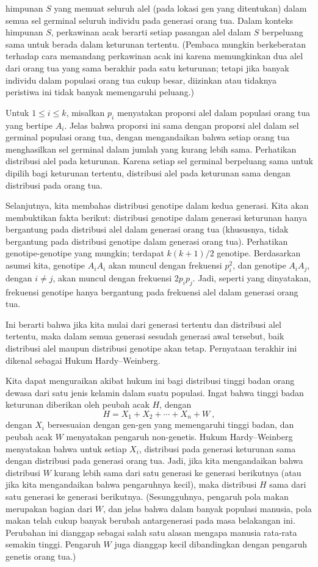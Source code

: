 himpunan $S$ yang memuat seluruh alel (pada lokasi gen yang ditentukan) dalam semua sel germinal
seluruh individu pada generasi orang tua.  Dalam konteks himpunan $S$, perkawinan acak berarti
setiap pasangan alel dalam $S$ berpeluang sama untuk berada dalam keturunan tertentu.  (Pembaca
mungkin berkeberatan terhadap cara memandang perkawinan acak ini karena memungkinkan dua alel dari
orang tua yang sama berakhir pada satu keturunan; tetapi jika banyak individu dalam populasi orang
tua cukup besar, diizinkan atau tidaknya peristiwa ini tidak banyak memengaruhi peluang.)
\par
Untuk $1 \le i \le k$, misalkan $p_i$ menyatakan proporsi alel dalam populasi orang tua yang
bertipe $A_i$.  Jelas bahwa proporsi ini sama dengan proporsi alel dalam sel germinal populasi
orang tua, dengan mengandaikan bahwa setiap orang tua menghasilkan sel germinal dalam jumlah yang
kurang lebih sama.  Perhatikan distribusi alel pada keturunan.  Karena setiap sel germinal berpeluang sama
untuk dipilih bagi keturunan tertentu, distribusi alel pada keturunan sama dengan distribusi pada
orang tua.
\par
Selanjutnya, kita membahas distribusi genotipe dalam kedua generasi.  Kita akan membuktikan fakta
berikut: distribusi genotipe dalam generasi keturunan hanya bergantung pada distribusi alel dalam
generasi orang tua (khususnya, tidak bergantung pada distribusi genotipe dalam generasi orang tua).
Perhatikan genotipe-genotipe yang mungkin; terdapat $k(k+1)/2$ genotipe.  Berdasarkan asumsi kita,
genotipe $A_iA_i$ akan muncul dengan frekuensi $p_i^2$, dan genotipe $A_iA_j$, dengan $i \ne j$,
akan muncul dengan frekuensi $2p_ip_j$.  Jadi, seperti yang dinyatakan, frekuensi genotipe hanya
bergantung pada frekuensi alel dalam generasi orang tua.
\par
Ini berarti bahwa jika kita mulai dari generasi tertentu dan distribusi alel tertentu, maka dalam
semua generasi sesudah generasi awal tersebut, baik distribusi alel maupun distribusi genotipe akan
tetap.  Pernyataan terakhir ini dikenal sebagai Hukum Hardy--Weinberg.
\par
Kita dapat menguraikan akibat hukum ini bagi distribusi tinggi badan orang dewasa dari satu jenis
kelamin dalam suatu populasi.  Ingat bahwa tinggi badan keturunan diberikan oleh peubah acak $H$,
dengan
$$H = X_1 + X_2 + \cdots + X_n + W\ ,$$
dengan $X_i$ bersesuaian dengan gen-gen yang memengaruhi tinggi badan, dan peubah acak $W$
menyatakan pengaruh non-genetis.  Hukum Hardy--Weinberg menyatakan bahwa untuk setiap $X_i$,
distribusi pada generasi keturunan sama dengan distribusi pada generasi orang tua.  Jadi, jika kita
mengandaikan bahwa distribusi $W$ kurang lebih sama dari satu generasi ke generasi berikutnya (atau
jika kita mengandaikan bahwa pengaruhnya kecil), maka distribusi $H$ sama dari satu generasi ke
generasi berikutnya.  (Sesungguhnya, pengaruh pola makan merupakan bagian dari $W$, dan jelas bahwa
dalam banyak populasi manusia, pola makan telah cukup banyak berubah antargenerasi pada masa
belakangan ini.  Perubahan ini dianggap sebagai salah satu alasan mengapa manusia rata-rata semakin
tinggi.  Pengaruh $W$ juga dianggap kecil dibandingkan dengan pengaruh genetis orang tua.)

